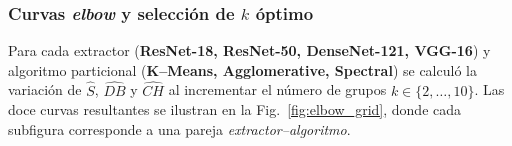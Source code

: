 \subsubsection{Curvas \emph{elbow} y selección de $k$ óptimo}

Para cada extractor (\textbf{ResNet-18, ResNet-50, DenseNet-121, VGG-16})
y algoritmo particional (\textbf{K–Means, Agglomerative, Spectral})
se calculó la variación de \(\widehat S\), \(\widehat{DB}\) y
\(\widehat{CH}\) al incrementar el número de grupos
\(k\in\{2,\dots,10\}\).
Las doce curvas resultantes se ilustran en la
Fig.~\ref{fig:elbow_grid}, donde cada subfigura corresponde a una pareja
\emph{extractor–algoritmo}.

